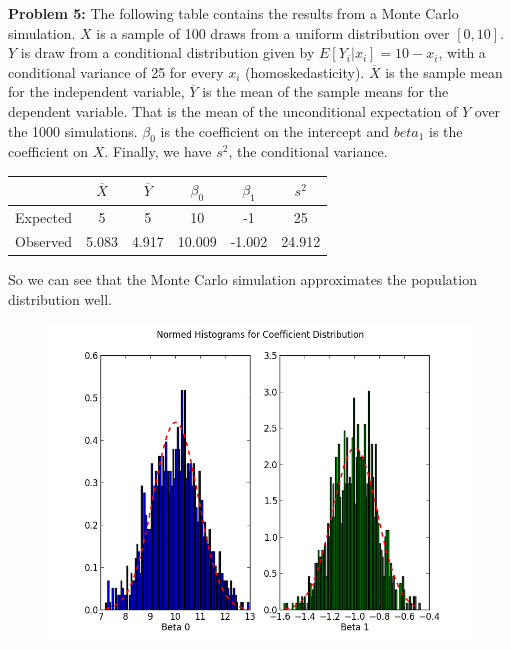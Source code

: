 \documentclass[11pt]{article}
\begin{document}
\textbf{Problem 5:}  The following table contains the results from a Monte Carlo simulation.  $X$ is a sample of 100 draws from a uniform distribution over $[0, 10]$. $Y$ is draw from a conditional distribution given by $E[Y_{i}|x_{i}] = 10 - x_{i}$, with a conditional variance of 25 for every $x_{i}$ (homoskedasticity).  $\overline{X}$ is the sample mean for the independent variable, $\overline{Y}$ is the mean of the sample means for the dependent variable.  That is the mean of the unconditional expectation of $Y$ over the 1000 simulations.  $\beta_{0}$ is the coefficient on the intercept and $beta_{1}$ is the coefficient on $X$. Finally, we have $s^{2}$, the conditional variance.
{
\setlength{\extrarowheight}{3pt}
    \begin{center}
        \begin{tabular}{ | c | c | c | c | c | c |}
            \hline
            & $\overline{X}$ & $\overline{Y}$ & $\beta_{0}$ & $\beta_{1}$ & $s^{2}$\\
            \hline
            Expected & 5 & 5 & 10 & -1 & 25\\
            \hline
            Observed & 5.083 & 4.917 & 10.009 & -1.002 & 24.912\\
            \hline
        \end{tabular}
    \end{center}
}

So we can see that the Monte Carlo simulation approximates the population distribution well.

\begin{figure}[htb]
    \centering
    \includegraphics[scale = 0.5]{HW2Histograms}
\end{figure}
\end{document}
